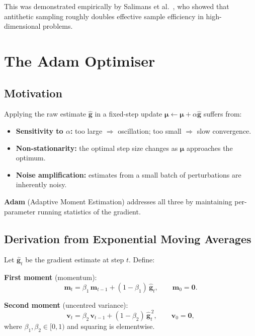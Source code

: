 \documentclass[12pt, a4paper]{article}
\newcommand{\bmu}{\boldsymbol{\mu}}
\newcommand{\mvec}{\mathbf{m}}           %
\newcommand{\vvec}{\mathbf{v}}           %
\begin{document}
\noindent
This was demonstrated empirically by Salimans et al.\ \cite{salimans2017},
who showed that antithetic sampling roughly doubles effective sample
efficiency in high-dimensional problems.

\section{The Adam Optimiser}
\label{sec:adam}

\subsection{Motivation}

Applying the raw estimate $\hat{\mathbf{g}}$ in a fixed-step update
$\bmu \leftarrow \bmu + \alpha\hat{\mathbf{g}}$ suffers from:
\begin{itemize}
  \item \textbf{Sensitivity to $\alpha$:}
        too large $\Rightarrow$ oscillation; too small $\Rightarrow$ slow convergence.
  \item \textbf{Non-stationarity:}
        the optimal step size changes as $\bmu$ approaches the optimum.
  \item \textbf{Noise amplification:}
        estimates from a small batch of perturbations are inherently noisy.
\end{itemize}
\textbf{Adam} (Adaptive Moment Estimation) \cite{kingma2015} addresses all
three by maintaining per-parameter running statistics of the gradient.

\subsection{Derivation from Exponential Moving Averages}

Let $\hat{\mathbf{g}}_t$ be the gradient estimate at step $t$.  Define:

\medskip
\noindent
\textbf{First moment} (momentum):
\begin{equation}
  \mvec_t = \beta_1\,\mvec_{t-1} + (1-\beta_1)\,\hat{\mathbf{g}}_t,
  \qquad \mvec_0 = \mathbf{0}.
  \label{eq:m}
\end{equation}

\noindent
\textbf{Second moment} (uncentred variance):
\begin{equation}
  \vvec_t = \beta_2\,\vvec_{t-1} + (1-\beta_2)\,\hat{\mathbf{g}}_t^{\,2},
  \qquad \vvec_0 = \mathbf{0},
  \label{eq:v}
\end{equation}
where $\beta_1,\beta_2\in[0,1)$ and squaring is elementwise.
\end{document}
